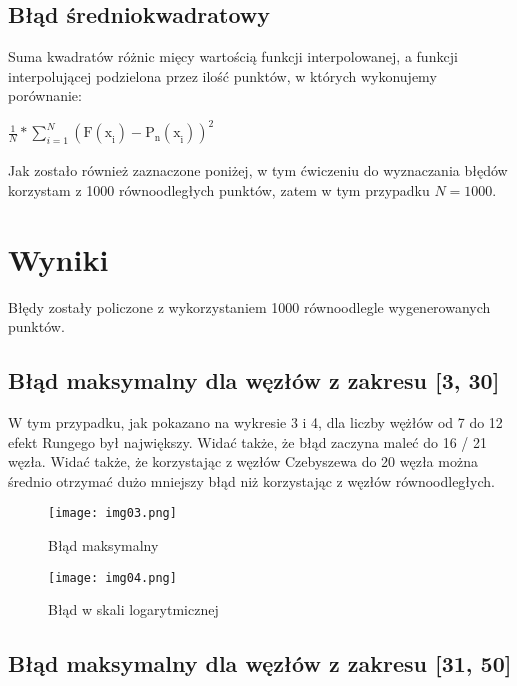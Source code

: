 \documentclass{article}
\begin{document}
\subsection{Błąd średniokwadratowy}

Suma kwadratów różnic mięcy wartością funkcji interpolowanej, a funkcji interpolującej podzielona przez ilość punktów, w których wykonujemy porównanie:

\begin{center}
\(\frac{1}{N} * \sum_{i = 1}^{N}\mathrm{(F(\mathrm{x}_{i}^{}) - \mathrm{P}_{n}^{}(\mathrm{x}_{i}^{}))}_{}^{2}\)
\end{center}

Jak zostało również zaznaczone poniżej, w tym ćwiczeniu do wyznaczania błędów korzystam z 1000 równoodległych punktów, zatem w tym przypadku \(N = 1000\).

\section{Wyniki}

Błędy zostały policzone z wykorzystaniem 1000 równoodlegle wygenerowanych punktów.

\subsection{Błąd maksymalny dla węzłów z zakresu [3, 30]}

W tym przypadku, jak pokazano na wykresie 3 i 4, dla liczby wężłów od 7 do 12 efekt Rungego był największy. Widać także, że błąd zaczyna maleć do 16 / 21 węzła. Widać także, że korzystając z węzłów Czebyszewa do 20 węzła można średnio otrzymać dużo mniejszy błąd niż korzystając z węzłów równoodległych.

\begin{figure}[H]
  \begin{minipage}[b]{0.49\textwidth}
    \texttt{[image: img03.png]}
    \caption{Błąd maksymalny}
  \end{minipage}
  \hfill
  \begin{minipage}[b]{0.49\textwidth}
    \texttt{[image: img04.png]}
    \caption{Błąd w skali logarytmicznej}
  \end{minipage}
\end{figure}

\subsection{Błąd maksymalny dla węzłów z zakresu [31, 50]}
\end{document}
